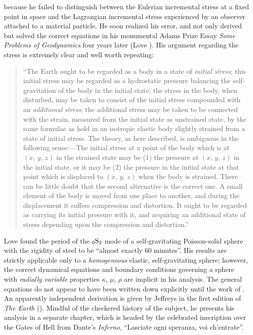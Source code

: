 because he failed to distinguish between the Eulerian incremental
stress at a fixed point in space and the Lagrangian incremental stress
experienced by an observer attached to a material particle.  He soon
realized his error, and not only derived but solved the correct equations
in his monumental Adams Prize Essay {\em Some Problems of Geodynamics\/}
four years later (Love \citeyear{love11}).  His argument regarding the stress is
extremely clear and well worth repeating:
\begin{quote}
``The Earth ought to be regarded as a body in a state of {\em initial stress\/};
this initial stress may be regarded as a hydrostatic pressure balancing the
self-gravitation of the body in the initial state; the stress in the body,
when disturbed, may be taken to consist of the initial stress compounded
with an {\em additional stress\/}; the additional stress may be taken to be
connected with the strain, measured from the initial state as unstrained
state, by the same formulae as hold in an isotropic elastic body slightly
strained from a state of initial stress.  The theory, as here described,
is ambiguous in the following sense:---The initial stress at a point of the
body which is at $(x,\,y,\,z)$ in the strained state may be (1) the pressure
at $(x,\,y,\,z)$ in the initial state, or it may be (2) the pressure in the
initial state at that point which is displaced to $(x,\,y,\,z)$ when the body
is strained.  There can be little doubt that the second alternative is the
correct one.  A small element of the body is moved from one place to another,
and during the displacement it suffers compression and distortion.  It ought
to be regarded as carrying its initial pressure with it, and acquiring an
additional state of stress depending upon the compression and distortion.''
\end{quote}
Love found the period of the ${}_0{\rm S}_2$ mode of a
self-gravitating Poisson-solid sphere with the rigidity of steel
to be ``almost exactly 60 minutes''.  His results are strictly
applicable only to a {\em homogeneous\/} elastic, self-gravitating
%
sphere; however, the correct dynamical equations and boundary conditions
governing a sphere with {\em radially variable\/} properties $\kappa$,
$\mu$, $\rho$ are implicit in his analysis. 
The general equations do not appear
to have been written down explicitly until the work of \textcite{hoskins20}.
An apparently independent derivation is given by Jeffreys
in the first edition of {\em The Earth\/} (\citeyear{jeffreys24}).
Mindful of the checkered history of the subject, he presents
his analysis in a separate chapter, which is headed
by the celebrated inscription over the Gates of Hell from
Dante's {\em Inferno\/}, ``Lasciate ogni speranza, voi ch'entrate''.

